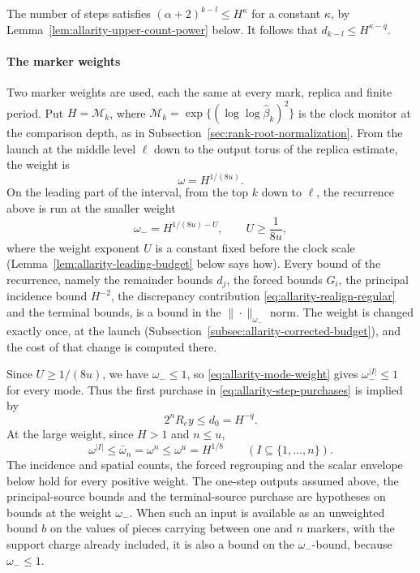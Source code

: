The number of steps satisfies $(\alpha+2)^{k-l}\le H^{\kappa}$ for a
constant $\kappa$, by Lemma~\ref{lem:allarity-upper-count-power} below.
It follows that $d_{k-l}\le H^{\kappa-q}$.

\paragraph*{The marker weights}
Two marker weights are used, each the same at every mark, replica and
finite period. Put $H=\mathcal M_k$, where
$\mathcal M_k=\exp\{(\log\log\widehat\beta_k)^2\}$ is the clock monitor
at the comparison depth, as in Subsection~\ref{sec:rank-root-normalization}.
From the launch at the middle level $\ell$ down to the output torus of
the replica estimate, the weight is
\begin{equation}\label{eq:allarity-marker-weight}
 \omega=H^{1/(8u)} .
\end{equation}
On the leading part of the interval, from the top $k$ down to $\ell$,
the recurrence above is run at the smaller weight
\begin{equation}\label{eq:allarity-upper-weight}
 \omega_-=H^{1/(8u)-U},\qquad U\ge\frac1{8u},
\end{equation}
where the weight exponent $U$ is a constant fixed before the clock scale
(Lemma~\ref{lem:allarity-leading-budget} below says how). Every bound
of the recurrence, namely the remainder bounds $d_j$, the forced bounds
$G_i$, the principal incidence bound $H^{-2}$, the discrepancy
contribution \eqref{eq:allarity-realign-regular} and the terminal
bounds, is a bound in the $\|\cdot\|_{\omega_-}$ norm. The weight is
changed exactly once, at the launch
(Subsection~\ref{subsec:allarity-corrected-budget}), and the cost of
that change is computed there.

Since $U\ge1/(8u)$, we have $\omega_-\le1$, so
\eqref{eq:allarity-mode-weight} gives $\omega_-^{|I|}\le1$ for every
mode. Thus the first purchase in \eqref{eq:allarity-step-purchases} is
implied by
\begin{equation}\label{eq:allarity-weighted-discrepancy}
 2^nR_ey\le d_0=H^{-q}.
\end{equation}
At the large weight, since $H>1$ and $n\le u$,
\begin{equation}\label{eq:allarity-weight-cap}
 \omega^{|I|}\le\bar\omega_n=\omega^n\le\omega^u=H^{1/8}
 \qquad (I\subseteq\{1,\ldots,n\}).
\end{equation}
The incidence and spatial counts, the forced regrouping and the scalar
envelope below hold for every positive weight. The one-step outputs
assumed above, the principal-source bounds and the terminal-source
purchase are hypotheses on bounds at the weight $\omega_-$. When such an
input is available as an unweighted bound $b$ on the values of pieces
carrying between one and $n$ markers, with the support charge already
included, it is also a bound on the $\omega_-$-bound, because
$\omega_-\le1$.

